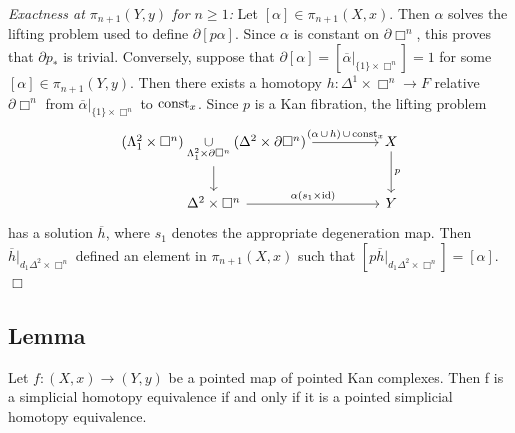         \emph{Exactness at $\pi_{n+1}(Y, y)$ for $n \geq 1$:} Let $[\alpha] \in \pi_{n+1}(X, x)$. Then $\alpha$ solves the lifting problem used to define $\partial [p \alpha]$. Since $\alpha$ is constant on $\partial \Box^n$, this proves that $\partial p_{*}$ is trivial.
        Conversely, suppose that $\partial [\alpha] = [{\overline{\alpha}|}_{\{1\} \times \Box^n}] = 1$ for some $[\alpha] \in \pi_{n+1}(Y, y)$. Then there exists a homotopy $h \colon \Delta^1 \times \Box^n \to F$ relative $\partial \Box^n$ from ${\overline{\alpha}|}_{\{1\} \times \Box^n}$ to $\operatorname{const}_x$. Since $p$ is a Kan fibration, the lifting problem
        \begin{equation*}
            \begin{tikzcd}[column sep=huge]
                (\horn{2}{1} \times \Box^n) \underset{\horn{2}{1} \times \partial \Box^n}{\cup} (\Delta^2 \times \partial \Box^n) \arrow[d] \arrow[r, "{(\alpha \, \cup \, h)} \, \cup \, \const_x"] & X \arrow[d, "p"] \\
                \Delta^2 \times \Box^n \arrow[r, "\alpha {(s_1 \times \id)}"] & Y
            \end{tikzcd}
        \end{equation*}
        has a solution $\overline{h}$, where $s_1$ denotes the appropriate degeneration map. Then ${\overline{h}|}_{d_1 \Delta^2 \times \Box^n}$ defined an element in $\pi_{n+1}(X, x)$ such that $[{p \overline{h}|}_{d_1 \Delta^2 \times \Box^n}] = [\alpha]$.\hfill$\Box$

    \subsection{Lemma}\label{chV-3-9}
        Let $f \colon (X, x) \to (Y, y)$ be a pointed map of pointed Kan complexes. Then f is a simplicial homotopy equivalence if and only if it is a pointed simplicial homotopy equivalence.
        \smallskip

